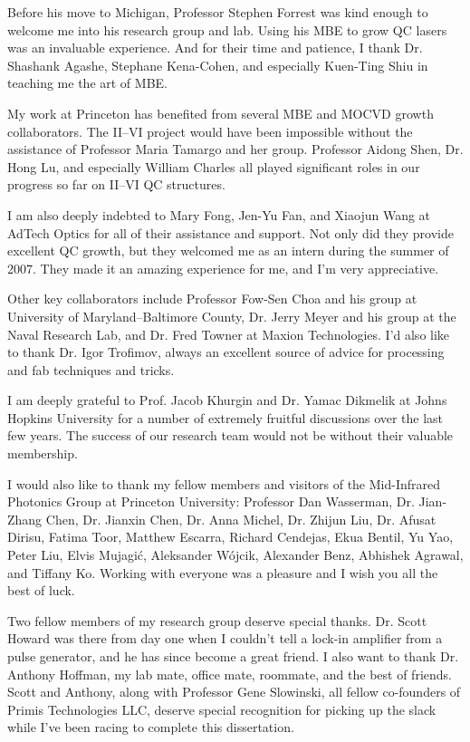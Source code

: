 Before his move to Michigan, Professor Stephen Forrest was kind enough to welcome me into his research group and lab.  Using his MBE to grow QC lasers was an invaluable experience.  And for their time and patience, I thank Dr. Shashank Agashe, Stephane Kena-Cohen, and especially Kuen-Ting Shiu in teaching me the art of MBE.

My work at Princeton has benefited from several MBE and MOCVD growth collaborators.  The II--VI project would have been impossible without the assistance of Professor Maria Tamargo and her group.  Professor Aidong Shen, Dr. Hong Lu, and especially William Charles all played significant roles in our progress so far on II--VI QC structures.

I am also deeply indebted to Mary Fong, Jen-Yu Fan, and Xiaojun Wang at AdTech Optics for all of their assistance and support.  Not only did they provide excellent QC growth, but they welcomed me as an intern during the summer of 2007. They made it an amazing experience for me, and I'm very appreciative.

Other key collaborators include Professor Fow-Sen Choa and his group at University of Maryland--Baltimore County, Dr. Jerry Meyer and his group at the Naval Research Lab, and Dr. Fred Towner at Maxion Technologies.  I'd also like to thank Dr. Igor Trofimov, always an excellent source of advice for processing and fab techniques and tricks.

I am deeply grateful to Prof. Jacob Khurgin and Dr. Yamac Dikmelik at Johns Hopkins University for a number of extremely fruitful discussions over the last few years.  The success of our research team would not be without their valuable membership.

I would also like to thank my fellow members and visitors of the Mid-Infrared Photonics Group at Princeton University: Professor Dan Wasserman, Dr. Jian-Zhang Chen, Dr. Jianxin Chen, Dr. Anna Michel, Dr. Zhijun Liu, Dr. Afusat Dirisu, Fatima Toor, Matthew Escarra, Richard Cendejas, Ekua Bentil, Yu Yao, Peter Liu, Elvis Mujagi\'{c}, Aleksander W\'{o}jcik, Alexander Benz, Abhishek Agrawal, and Tiffany Ko. Working with everyone was a pleasure and I wish you all the best of luck.

Two fellow members of my research group deserve special thanks.  Dr. Scott Howard was there from day one when I couldn't tell a lock-in amplifier from a pulse generator, and he has since become a great friend.  I also want to thank Dr. Anthony Hoffman, my lab mate, office mate, roommate, and the best of friends.  Scott and Anthony, along with Professor Gene Slowinski, all fellow co-founders of Primis Technologies LLC, deserve special recognition for picking up the slack while I've been racing to complete this dissertation.

